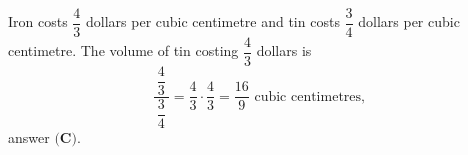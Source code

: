 Iron costs $\dfrac{4}{3}$ dollars per cubic centimetre and tin costs $\dfrac{3}{4}$ dollars per cubic centimetre. The volume of tin costing $\dfrac{4}{3}$ dollars is
\[\dfrac{\ \dfrac{4}{3}\ }{\dfrac{3}{4}}=\dfrac{4}{3}\cdot\dfrac{4}{3}=\boxed{\dfrac{16}{9}}\text{ cubic centimetres},\]
answer $\textbf{(C)}$.
